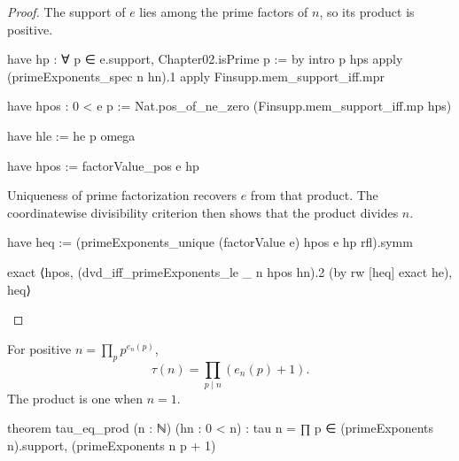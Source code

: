 \begin{proof}
  The support of $e$ lies among the prime factors of $n$, so its product is positive.

  \begin{lean}
    have hp : ∀ p ∈ e.support, Chapter02.isPrime p := by
      intro p hps
      apply (primeExponents_spec n hn).1
      apply Finsupp.mem_support_iff.mpr

      have hpos : 0 < e p := Nat.pos_of_ne_zero (Finsupp.mem_support_iff.mp hps)

      have hle := he p
      omega

    have hpos := factorValue_pos e hp
  \end{lean}

  Uniqueness of prime factorization recovers $e$ from that product.
  The coordinatewise divisibility criterion then shows that the product divides $n$.

  \begin{lean}
    have heq := (primeExponents_unique (factorValue e) hpos e hp rfl).symm

    exact ⟨hpos, (dvd_iff_primeExponents_le _ n hpos hn).2 (by
        rw [heq]
        exact he), heq⟩
  \end{lean}
\end{proof}

\begin{theorem}
  \label{ent:thm:tau-eq-prod}
  For positive $n=\prod_p p^{e_n(p)}$, \[ \tau(n)=\prod_{p\mid n}(e_n(p)+1). \] The product is one when $n=1$.

  \begin{lean}
    theorem tau_eq_prod (n : ℕ) (hn : 0 < n) :
        tau n = ∏ p ∈ (primeExponents n).support, (primeExponents n p + 1)
  \end{lean}
\end{theorem}

